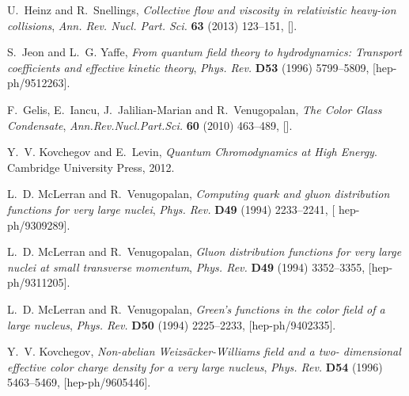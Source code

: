 \documentclass[onecolumn,showpacs,nobibnotes,nofootinbib,12pt,aps,prd,showpacs,notitlepage,nofootinbib,preprintnumbers,amsmath,amssymb]{article}
\begin{document}
\providecommand{\href}[2]{#2}\begingroup\raggedright\begin{thebibliography}{10}

U.~Heinz and R.~Snellings, \emph{{Collective flow and viscosity in relativistic
  heavy-ion collisions}},
  \href{https://doi.org/10.1146/annurev-nucl-102212-170540}{\emph{Ann. Rev.
  Nucl. Part. Sci.} {\bfseries 63} (2013) 123--151},
  [\href{https://arxiv.org/abs/1301.2826}{{}}].

S.~Jeon and L.~G. Yaffe, \emph{{From quantum field theory to hydrodynamics:
  Transport coefficients and effective kinetic theory}},
  \href{https://doi.org/10.1103/PhysRevD.53.5799}{\emph{Phys. Rev.} {\bfseries
  D53} (1996) 5799--5809},
  [\href{https://arxiv.org/abs/hep-ph/9512263}{{\ttfamily hep-ph/9512263}}].

F.~Gelis, E.~Iancu, J.~Jalilian-Marian and R.~Venugopalan, \emph{{The Color
  Glass Condensate}},
  \href{https://doi.org/10.1146/annurev.nucl.010909.083629}{\emph{Ann.Rev.Nucl.Part.Sci.}
  {\bfseries 60} (2010) 463--489},
  [\href{https://arxiv.org/abs/1002.0333}{{}}].

Y.~V. Kovchegov and E.~Levin, \emph{Quantum Chromodynamics at High Energy}.
\newblock Cambridge University Press, 2012.

L.~D. McLerran and R.~Venugopalan, \emph{Computing quark and gluon distribution
  functions for very large nuclei}, {\emph{Phys. Rev.} {\bfseries D49} (1994)
  2233--2241}, [\href{https://arxiv.org/abs/hep-ph/9309289}{{\ttfamily
  hep-ph/9309289}}].

L.~D. McLerran and R.~Venugopalan, \emph{Gluon distribution functions for very
  large nuclei at small transverse momentum}, {\emph{Phys. Rev.} {\bfseries
  D49} (1994) 3352--3355},
  [\href{https://arxiv.org/abs/hep-ph/9311205}{{\ttfamily hep-ph/9311205}}].

L.~D. McLerran and R.~Venugopalan, \emph{Green's functions in the color field
  of a large nucleus}, {\emph{Phys. Rev.} {\bfseries D50} (1994) 2225--2233},
  [\href{https://arxiv.org/abs/hep-ph/9402335}{{\ttfamily hep-ph/9402335}}].

Y.~V. Kovchegov, \emph{Non-abelian {Weizs\"{a}cker-Williams} field and a two-
  dimensional effective color charge density for a very large nucleus},
  {\emph{Phys. Rev.} {\bfseries D54} (1996) 5463--5469},
  [\href{https://arxiv.org/abs/hep-ph/9605446}{{\ttfamily hep-ph/9605446}}].


\end{thebibliography}
\end{document}
